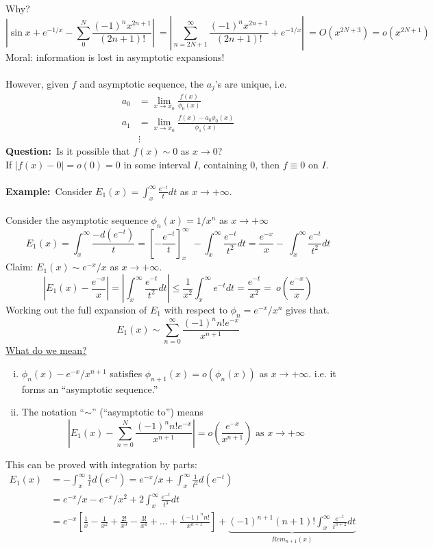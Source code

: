 \documentclass{article}
\newcommand{\example}{\textbf{Example:}}
\newcommand{\question}{\textbf{Question:}}
\begin{document}
Why?
\[ \left| \sin x + e^{-1/x} - \sum_0^N \frac{ (-1)^n x^{2n+1}}{(2n+1)!} \right| \
= \left| \sum_{n = 2N+1}^{\infty} \frac{(-1)^n x^{2n+1}}{(2n+1)!} + e^{-1/x} \right| \
=O(x^{2N+3}) = o(x^{2N+1}) \]
Moral: information is lost in asymptotic expansions!
\\
\\
However, given $f$ and asymptotic sequence, the $a_j$'s are unique, i.e.
\begin{align*}
a_0 &= \lim_{x \to x_0} \frac{f(x)}{\phi_0(x)} \\
a_1 &= \lim_{x \to x_0} \frac{f(x)-a_0 \phi_0(x)}{\phi_1(x)} \\
& \vdots
\end{align*}
\question\ Is it possible that $f(x) \sim 0$ as $x \to 0$?
\\
If $|f(x) - 0| = o(0)=0$ in some interval $I$, containing $0$, then
$f \equiv 0$ on $I$.
\\
\\
\example\ Consider $\displaystyle E_1(x) = \int_{x}^{\infty} \frac{e^{-t}}{t} dt$
as $x \to + \infty$.
\\
\\
Consider the asymptotic sequence $\phi_n(x) = 1/x^n$ as $x \to + \infty$
\[ E_1(x) = \int_{x}^{\infty} \frac{-d(e^{-t})}{t} = \left[ -\frac{e^{-t}}{t} \right]_{x}^{\infty} \
- \int_x^{\infty} \frac{e^{-t}}{t^2} dt = \frac{e^{-x}}{x} - \
\int_x^{\infty} \frac{e^{-t}}{t^2} dt\]
Claim: $E_1(x) \sim e^{-x}/x$ as $x \to + \infty$.
\[ \left| E_1(x) - \frac{e^{-x}}{x} \right| = \left| \int_x^{\infty} \frac{e^{-t}}{t^2} dt \right|
\leq \frac{1}{x^2} \int_x^{\infty} e^{-t} dt = \frac{e^{-t}}{x^2} = \
o\left(\frac{e^{-x}}{x} \right) \]
Working out the full expansion of $E_1$ with respect to
$\phi_n = e^{-x}/x^n$ gives that.
\[ E_1(x) \sim \sum_{n=0}^{\infty} \frac{(-1)^n n! e^{-x}}{x^{n+1}} \]
\underline{What do we mean?}
\begin{enumerate}[(i)]
\item $\phi_n (x) - e^{-x}/x^{n+1}$ satisfies
		$\phi_{n+1}(x) = o(\phi_n(x))$ as $x \to + \infty$.
		i.e. it forms an ``asymptotic sequence.''
\item The notation ``$\sim$'' (``asymptotic to'') means
\[ \left|E_1(x) - \sum_{n=0}^N \frac{(-1)^n n! e^{-x} }{x^{n+1}} \right| = o\left(
\frac{e^{-x}}{x^{n+1}} \right) \mbox{ as } x \to + \infty\]
\end{enumerate}
This can be proved with integration by parts:
\begin{align*}
E_1(x) &= -\int_x^{\infty} \frac{1}{t} d(e^{-t}) = e^{-x}/x + \int_x^{\infty}
\frac{1}{t^2} d(e^{-t}) \\
&= e^{-x}/x - e^{-x}/x^2 + 2 \int_x^{\infty} \frac{e^{-t}}{t^3}dt  \\
&= e^{-x} \left[ \frac{1}{x} - \frac{1}{x^2} + \frac{2!}{x^3} - \frac{3!}{x^4}
+ \dots + \frac{(-1)^n n!}{x^{n+1}} \right] + \underbrace{(-1)^{n+1} (n+1)!
\int_x^{\infty} \frac{e^{-t}}{t^{n+2}} dt}_{Rem_{n+1}(x)}
\end{align*}
\end{document}
